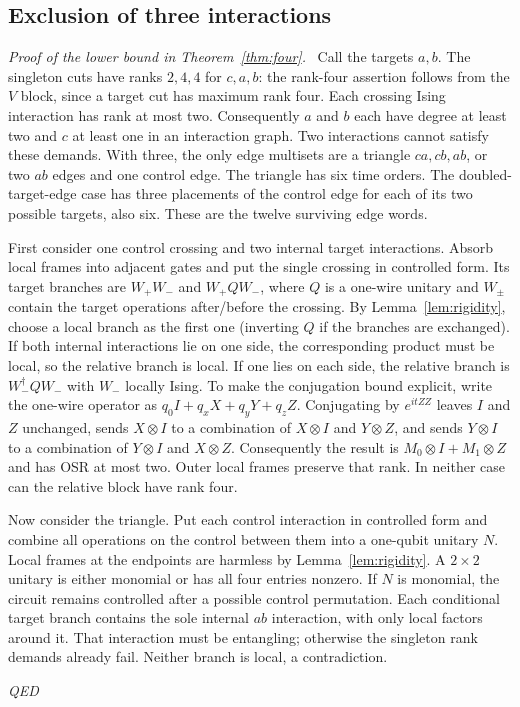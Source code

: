 \documentclass[a4paper,onecolumn,11pt,unpublished]{quantumarticle}
\newenvironment{proof}[1][Proof]{\par\noindent\textit{#1.}\ }{\hfill\textit{QED}\par}
\begin{document}
\subsection{Exclusion of three interactions}
\begin{proof}[Proof of the lower bound in Theorem~\ref{thm:four}]
Call the targets $a,b$. The singleton cuts have ranks $2,4,4$ for
$c,a,b$: the rank-four assertion follows from the $V$ block, since a
target cut has maximum rank four. Each crossing Ising interaction has
rank at most two. Consequently $a$ and $b$ each have degree at least two
and $c$ at least one in an interaction graph. Two interactions cannot
satisfy these demands. With three, the only edge multisets are a triangle
$ca,cb,ab$, or two $ab$ edges and one control edge. The triangle has six time orders. The doubled-target-edge case has three placements of the control edge for each of its two possible targets, also six. These are the twelve surviving edge words.

First consider one control crossing and two internal target interactions.
Absorb local frames into adjacent gates and put the single crossing in
controlled form. Its target branches are
$W_+W_-$ and $W_+QW_-$, where $Q$ is a one-wire unitary and $W_\pm$
contain the target operations after/before the crossing. By
Lemma~\ref{lem:rigidity}, choose a local branch as the first one
(inverting $Q$ if the branches are exchanged). If both internal interactions
lie on one side, the corresponding product must be local, so the relative
branch is local. If one lies on each side, the relative branch is
$W_-^\dagger QW_-$ with $W_-$ locally Ising. To make the conjugation bound explicit, write the one-wire operator as
$q_0I+q_xX+q_yY+q_zZ$. Conjugating by $e^{itZZ}$ leaves $I$ and $Z$
unchanged, sends $X\otimes I$ to a combination of $X\otimes I$ and
$Y\otimes Z$, and sends $Y\otimes I$ to a combination of $Y\otimes I$
and $X\otimes Z$. Consequently the result is
$M_0\otimes I+M_1\otimes Z$ and has OSR at most two. Outer local frames
preserve that rank. In neither case can the relative block have rank four.

Now consider the triangle. Put each control interaction in controlled
form and combine all operations on the control between them into a
one-qubit unitary $N$. Local frames at the endpoints are harmless by
Lemma~\ref{lem:rigidity}. A $2\times2$ unitary is either monomial or has
all four entries nonzero. If $N$ is monomial, the circuit remains controlled
after a possible control permutation. Each conditional target branch
contains the sole internal $ab$ interaction, with only local factors
around it. That interaction must be entangling; otherwise the singleton
rank demands already fail. Neither branch is local, a contradiction.


\end{proof}
\end{document}
